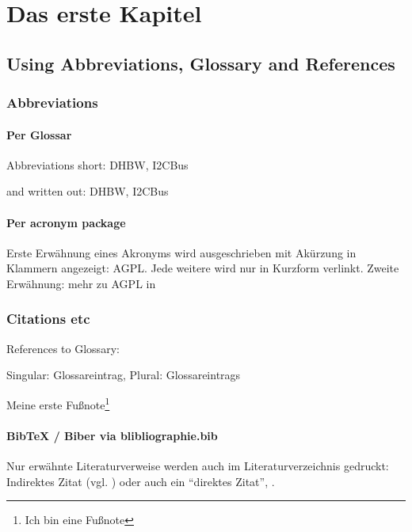 \chapter{Das erste Kapitel}
\section{Using Abbreviations, Glossary and References}
\subsection{Abbreviations}
\subsubsection{Per Glossar}
Abbreviations short: \acrshort{DHBW}, \acrshort{I2CBus} 

and written out: \gls{DHBW}, \gls{I2CBus}

\subsubsection{Per acronym package}
Erste Erwähnung eines Akronyms wird ausgeschrieben mit Akürzung in Klammern angezeigt: \ac{AGPL}. Jede weitere wird nur in Kurzform verlinkt. Zweite Erwähnung: mehr zu \ac{AGPL} in \cite{fsf:2007}

\subsection{Citations etc}
References to Glossary:

 Singular: \gls{Glossareintrag}, Plural: \glspl{Glossareintrag}

Meine erste Fußnote\footnote{Ich bin eine Fußnote}

\subsubsection{BibTeX / Biber via blibliographie.bib}
Nur erwähnte Literaturverweise werden auch im Literaturverzeichnis gedruckt:
Indirektes Zitat (vgl. \cite{baumgartner:2002}) oder auch ein ``direktes Zitat'', \cite{dreyfus:1980}.


% 


